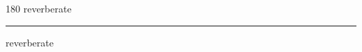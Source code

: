 
\begin{frame}
\begin{center}
\begin{turn}{180}
{\fontsize{2.5cm}{1em}\selectfont reverberate}
\end{turn}
\vspace{1em}\par  
\hrule
\vspace{1em}\par  
{\fontsize{2.5cm}{1em}\selectfont reverberate}
\end{center}
\end{frame}
